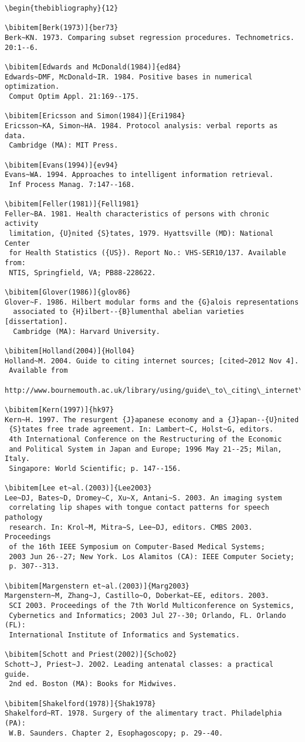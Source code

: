 \documentclass{gCMB2e}
\begin{document}
\begin{verbatim}
\begin{thebibliography}{12}

\bibitem[Berk(1973)]{ber73}
Berk~KN. 1973. Comparing subset regression procedures. Technometrics. 20:1--6.

\bibitem[Edwards and McDonald(1984)]{ed84}
Edwards~DMF, McDonald~IR. 1984. Positive bases in numerical optimization.
 Comput Optim Appl. 21:169--175.

\bibitem[Ericsson and Simon(1984)]{Eri1984}
Ericsson~KA, Simon~HA. 1984. Protocol analysis: verbal reports as data.
 Cambridge (MA): MIT Press.

\bibitem[Evans(1994)]{ev94}
Evans~WA. 1994. Approaches to intelligent information retrieval.
 Inf Process Manag. 7:147--168.

\bibitem[Feller(1981)]{Fell1981}
Feller~BA. 1981. Health characteristics of persons with chronic activity
 limitation, {U}nited {S}tates, 1979. Hyattsville (MD): National Center
 for Health Statistics ({US}). Report No.: VHS-SER10/137. Available from:
 NTIS, Springfield, VA; PB88-228622.

\bibitem[Glover(1986)]{glov86}
Glover~F. 1986. Hilbert modular forms and the {G}alois representations
  associated to {H}ilbert--{B}lumenthal abelian varieties [dissertation].
  Cambridge (MA): Harvard University.

\bibitem[Holland(2004)]{Holl04}
Holland~M. 2004. Guide to citing internet sources; [cited~2012 Nov 4].
 Available from
 http://www.bournemouth.ac.uk/library/using/guide\_to\_citing\_internet\_sourc.html.

\bibitem[Kern(1997)]{hk97}
Kern~H. 1997. The resurgent {J}apanese economy and a {J}apan--{U}nited
 {S}tates free trade agreement. In: Lambert~C, Holst~G, editors.
 4th International Conference on the Restructuring of the Economic
 and Political System in Japan and Europe; 1996 May 21--25; Milan, Italy.
 Singapore: World Scientific; p. 147--156.

\bibitem[Lee et~al.(2003)]{Lee2003}
Lee~DJ, Bates~D, Dromey~C, Xu~X, Antani~S. 2003. An imaging system
 correlating lip shapes with tongue contact patterns for speech pathology
 research. In: Krol~M, Mitra~S, Lee~DJ, editors. CMBS 2003. Proceedings
 of the 16th IEEE Symposium on Computer-Based Medical Systems;
 2003 Jun 26--27; New York. Los Alamitos (CA): IEEE Computer Society;
 p. 307--313.

\bibitem[Margenstern et~al.(2003)]{Marg2003}
Margenstern~M, Zhang~J, Castillo~O, Doberkat~EE, editors. 2003.
 SCI 2003. Proceedings of the 7th World Multiconference on Systemics,
 Cybernetics and Informatics; 2003 Jul 27--30; Orlando, FL. Orlando (FL):
 International Institute of Informatics and Systematics.

\bibitem[Schott and Priest(2002)]{Scho02}
Schott~J, Priest~J. 2002. Leading antenatal classes: a practical guide.
 2nd ed. Boston (MA): Books for Midwives.

\bibitem[Shakelford(1978)]{Shak1978}
Shakelford~RT. 1978. Surgery of the alimentary tract. Philadelphia (PA):
 W.B. Saunders. Chapter 2, Esophagoscopy; p. 29--40.
\end{verbatim}
\end{document}
